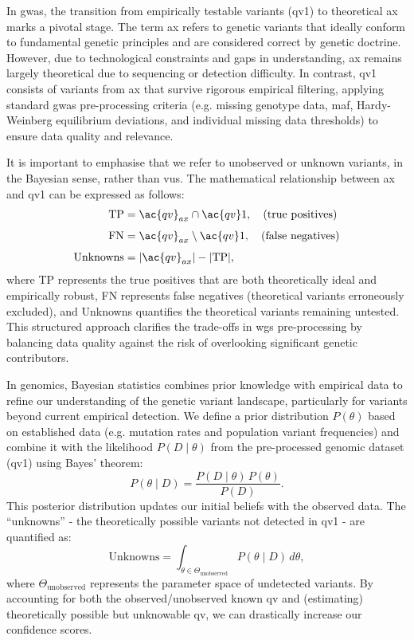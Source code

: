 In \ac{gwas}, the transition from empirically testable variants (\ac{qv}1) to theoretical \ac{ax} marks a pivotal stage. The term \ac{ax} refers to genetic variants that ideally conform to fundamental genetic principles and are considered correct by genetic doctrine. However, due to technological constraints and gaps in understanding, \ac{ax} remains largely theoretical due to sequencing or detection difficulty. In contrast, \ac{qv}1 consists of variants from \ac{ax} that survive rigorous empirical filtering, applying standard \ac{gwas} pre-processing criteria (e.g. missing genotype data, \ac{maf}, Hardy-Weinberg equilibrium deviations, and individual missing data thresholds) to ensure data quality and relevance.

It is important to emphasise that we refer to unobserved or unknown variants, in the Bayesian sense, rather than \ac{vus}. The mathematical relationship between \ac{ax} and \ac{qv}1 can be expressed as follows:
\begin{align*}
\text{TP} &= \ac{qv}_{ax} \cap \ac{qv}1, \quad \text{(true positives)}\\[1ex]
\text{FN} &= \ac{qv}_{ax} \setminus \ac{qv}1, \quad \text{(false negatives)}\\[1ex]
\text{Unknowns} &= |\ac{qv}_{ax}| - |\text{TP}|,
\end{align*}
where TP represents the true positives that are both theoretically ideal and empirically robust, FN represents false negatives (theoretical variants erroneously excluded), and Unknowns quantifies the theoretical variants remaining untested. This structured approach clarifies the trade-offs in \ac{wgs} pre-processing by balancing data quality against the risk of overlooking significant genetic contributors.


In genomics, Bayesian statistics combines prior knowledge with empirical data to refine our understanding of the genetic variant landscape, particularly for variants beyond current empirical detection. We define a prior distribution \(P(\theta)\) based on established data (e.g. mutation rates and population variant frequencies) and combine it with the likelihood \(P(D\mid\theta)\) from the pre-processed genomic dataset (\ac{qv}1) using Bayes' theorem:
$$
P(\theta\mid D) = \frac{P(D\mid\theta) \, P(\theta)}{P(D)}.
$$
This posterior distribution updates our initial beliefs with the observed data. The ``unknowns'' - the theoretically possible variants not detected in \ac{qv}1 - are quantified as:
$$
\text{Unknowns} = \int_{\theta \in \Theta_{\text{unobserved}}} P(\theta\mid D) \, d\theta,
$$
where \(\Theta_{\text{unobserved}}\) represents the parameter space of undetected variants. 
By accounting for both the observed/unobserved known \ac{qv} and (estimating) theoretically possible but unknowable \ac{qv}, we can drastically increase our confidence scores.

